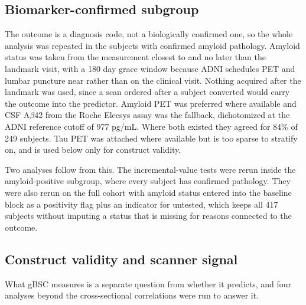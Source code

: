 \documentclass[blue]{ludusofficial}  %
\begin{document}
\subsection{Biomarker-confirmed subgroup}

The outcome is a diagnosis code, not a biologically confirmed one, so the whole analysis was repeated in the subjects with confirmed amyloid pathology. Amyloid status was taken from the measurement closest to and no later than the landmark visit, with a 180 day grace window because ADNI schedules PET and lumbar puncture near rather than on the clinical visit. Nothing acquired after the landmark was used, since a scan ordered after a subject converted would carry the outcome into the predictor. Amyloid PET was preferred where available and CSF A$\beta$42 from the Roche Elecsys assay was the fallback, dichotomized at the ADNI reference cutoff of 977 pg/mL. Where both existed they agreed for 84\% of 249 subjects. Tau PET was attached where available but is too sparse to stratify on, and is used below only for construct validity.

Two analyses follow from this. The incremental-value tests were rerun inside the amyloid-positive subgroup, where every subject has confirmed pathology. They were also rerun on the full cohort with amyloid status entered into the baseline block as a positivity flag plus an indicator for untested, which keeps all 417 subjects without imputing a status that is missing for reasons connected to the outcome.

\subsection{Construct validity and scanner signal}
\label{sec:construct-methods}

What gBSC measures is a separate question from whether it predicts, and four analyses beyond the cross-sectional correlations were run to answer it.
\end{document}
